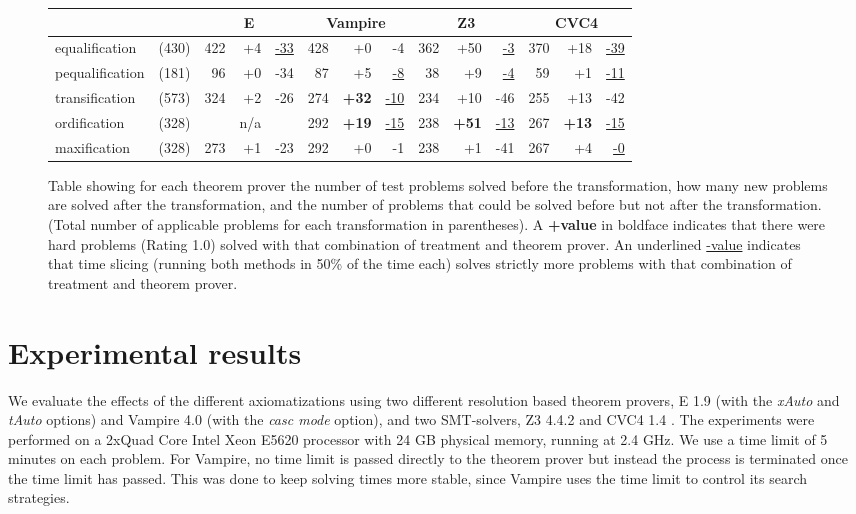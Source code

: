 \documentclass{article}
\begin{document}


\begin{figure}[ht]
\begin{center}
\setlength{\tabcolsep}{5.2pt}
\begin{tabular}{lr|rrr|rrr|rrr|rrr}
  & & \multicolumn{3}{c}{E} & \multicolumn{3}{c}{Vampire}&\multicolumn{3}{c}{Z3} &\multicolumn{3}{c}{CVC4} \\
\hline 
equalification & (430) & 422 & +4  & \underline{-33} & 428 & +0  & -4 & 362 & +50 & \underline{-3} & 370 & +18 & \underline{-39} \\
pequalification & (181) & 96 & +0 & -34 & 87 & +5 & \underline{-8}  & 38 & +9 & \underline{-4} & 59 & +1  &  \underline{-11} \\
transification  & (573) & 324 & +2 & -26 & 274 & {\bf +32} & \underline{-10} & 234 & +10 & -46 & 255 & +13 & -42 \\
ordification  & (328) & & n/a & & 292 & {\bf +19} & \underline{-15} & 238 & {\bf +51} & \underline{-13} & 267 & {\bf +13} &  \underline{-15} \\
maxification  & (328) & 273 & +1 & -23 & 292 & +0 & -1 & 238 & +1 & -41 & 267 & +4 & \underline{-0} \\
\end{tabular}
\end{center}
\vspace{-0.5cm}
\caption{Table showing for each theorem prover the number of test problems solved before the transformation,  how many new problems are solved after the transformation, and the number of problems that could be solved before but not after the transformation. (Total number of applicable problems for each transformation in parentheses). A {\bf +value} in boldface indicates that there were hard problems (Rating 1.0) solved with that combination of treatment and theorem prover. An underlined \underline{-value} indicates that time slicing (running both methods in 50\% of the time each) solves strictly more problems with that combination of treatment and theorem prover.}
\label{fig:overview}
\end{figure}

\section{Experimental results}
We evaluate the effects of the different axiomatizations using two different resolution based theorem provers, E 1.9 \cite{E} (with the \textit{xAuto} and \textit{tAuto} options) and Vampire 4.0 \cite{Vampire} (with the \textit{casc mode} option), and two SMT-solvers, Z3 4.4.2 \cite{Z3} and CVC4 1.4 \cite{CVC4}. The experiments were performed on a 2xQuad Core Intel Xeon E5620 processor with 24 GB physical memory, running at 2.4 GHz. We use a time limit of 5 minutes on each problem. For Vampire, no time limit is passed directly to the theorem prover but instead the process is terminated once the time limit has passed. This was done to keep solving times more stable, since Vampire uses the time limit to control its search strategies.
\end{document}
